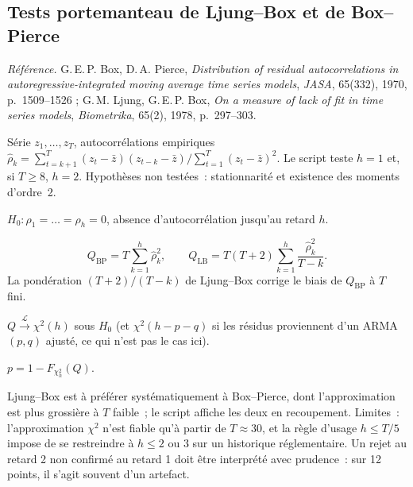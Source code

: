\documentclass[a4paper,11pt]{article}
\newcommand{\refl}[1]{{\small\textcolor{maincolor!70!black}{\textit{Référence.} #1}}\par\smallskip}
\newcounter{ficheid}
\newenvironment{fiche}[1]{%
  \stepcounter{ficheid}%
  \phantomsection
  \subsection{#1}%
  \label{fiche:\theficheid}%
}{%
  \end{description}\vspace{0.5em}%
}
\newcommand{\Cadre}{%
  \begin{description}[leftmargin=0pt, style=unboxed, itemsep=3pt, topsep=3pt, parsep=2pt]%
  \item[\textcolor{financeblue}{\textbf{1. Cadre, notations et hypothèses de validité (non testées).}}]}
\newcommand{\Hzero}{\item[\textcolor{financeblue}{\textbf{2. Hypothèse nulle.}}]}
\newcommand{\Stat}{\item[\textcolor{financeblue}{\textbf{3. Statistique de test.}}]}
\newcommand{\Loi}{\item[\textcolor{financeblue}{\textbf{4. Loi sous $H_0$.}}]}
\newcommand{\Pval}{\item[\textcolor{financeblue}{\textbf{5. p-value.}}]}
\newcommand{\Usage}{\item[\textcolor{financeblue}{\textbf{6. Usage et limites.}}]}
\begin{document}
\begin{fiche}{Tests portemanteau de Ljung--Box et de Box--Pierce}
\refl{G.\,E.\,P. Box, D.\,A. Pierce, \emph{Distribution of residual autocorrelations in
autoregressive-integrated moving average time series models}, \emph{JASA}, 65(332), 1970,
p.~1509--1526 ; G.\,M. Ljung, G.\,E.\,P. Box, \emph{On a measure of lack of fit in time series
models}, \emph{Biometrika}, 65(2), 1978, p.~297--303.}
\Cadre
Série $z_1,\dots,z_T$, autocorrélations empiriques
$\hat\rho_k = \sum_{t=k+1}^{T}(z_t-\bar z)(z_{t-k}-\bar z)\big/\sum_{t=1}^{T}(z_t-\bar z)^2$.
Le script teste $h = 1$ et, si $T \ge 8$, $h = 2$. Hypothèses non testées~: stationnarité et
existence des moments d'ordre~2.
\Hzero
$H_0 : \rho_1 = \dots = \rho_h = 0$, absence d'autocorrélation jusqu'au retard $h$.
\Stat
\[
  Q_{\mathrm{BP}} = T\sum_{k=1}^{h}\hat\rho_k^2 ,
  \qquad
  Q_{\mathrm{LB}} = T(T+2)\sum_{k=1}^{h}\frac{\hat\rho_k^2}{T-k}.
\]
La pondération $(T+2)/(T-k)$ de Ljung--Box corrige le biais de $Q_{\mathrm{BP}}$ à $T$ fini.
\Loi
$Q \xrightarrow{\ \mathcal{L}\ } \chi^2(h)$ sous $H_0$ (et $\chi^2(h-p-q)$ si les résidus
proviennent d'un ARMA$(p,q)$ ajusté, ce qui n'est pas le cas ici).
\Pval
$p = 1 - F_{\chi^2_h}(Q)$.
\Usage
Ljung--Box est à préférer systématiquement à Box--Pierce, dont l'approximation est plus grossière
à $T$ faible~; le script affiche les deux en recoupement. Limites~: l'approximation $\chi^2$ n'est
fiable qu'à partir de $T \approx 30$, et la règle d'usage $h \le T/5$ impose de se restreindre à
$h \le 2$ ou $3$ sur un historique réglementaire. Un rejet au retard 2 non confirmé au retard 1
doit être interprété avec prudence~: sur 12 points, il s'agit souvent d'un artefact.
\end{fiche}
\end{document}
